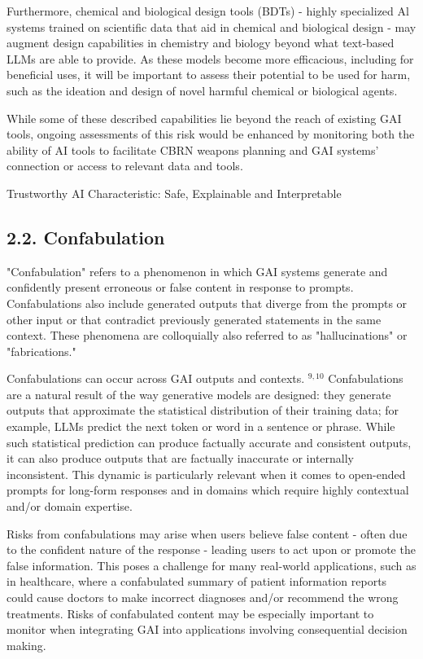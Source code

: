 \documentclass[10pt]{article}
\begin{document}
Furthermore, chemical and biological design tools (BDTs) - highly specialized Al systems trained on scientific data that aid in chemical and biological design - may augment design capabilities in chemistry and biology beyond what text-based LLMs are able to provide. As these models become more efficacious, including for beneficial uses, it will be important to assess their potential to be used for harm, such as the ideation and design of novel harmful chemical or biological agents.

While some of these described capabilities lie beyond the reach of existing GAI tools, ongoing assessments of this risk would be enhanced by monitoring both the ability of AI tools to facilitate CBRN weapons planning and GAI systems' connection or access to relevant data and tools.

Trustworthy AI Characteristic: Safe, Explainable and Interpretable
\subsection*{2.2. Confabulation}
"Confabulation" refers to a phenomenon in which GAI systems generate and confidently present erroneous or false content in response to prompts. Confabulations also include generated outputs that diverge from the prompts or other input or that contradict previously generated statements in the same context. These phenomena are colloquially also referred to as "hallucinations" or "fabrications."

Confabulations can occur across GAI outputs and contexts. ${ }^{9,10}$ Confabulations are a natural result of the way generative models are designed: they generate outputs that approximate the statistical distribution of their training data; for example, LLMs predict the next token or word in a sentence or phrase. While such statistical prediction can produce factually accurate and consistent outputs, it can also produce outputs that are factually inaccurate or internally inconsistent. This dynamic is particularly relevant when it comes to open-ended prompts for long-form responses and in domains which require highly contextual and/or domain expertise.

Risks from confabulations may arise when users believe false content - often due to the confident nature of the response - leading users to act upon or promote the false information. This poses a challenge for many real-world applications, such as in healthcare, where a confabulated summary of patient information reports could cause doctors to make incorrect diagnoses and/or recommend the wrong treatments. Risks of confabulated content may be especially important to monitor when integrating GAI into applications involving consequential decision making.
\end{document}
